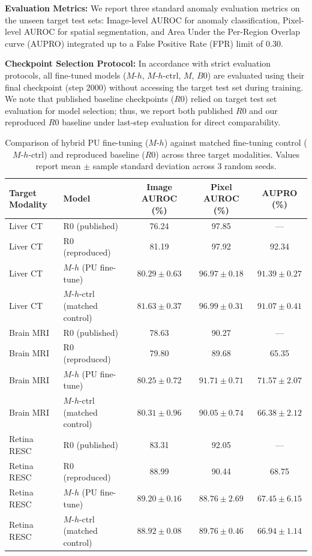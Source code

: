 \documentclass[10pt,twocolumn,letterpaper]{article}
\begin{document}
\noindent\textbf{Evaluation Metrics:} We report three standard anomaly evaluation metrics on the unseen target test sets: Image-level AUROC for anomaly classification, Pixel-level AUROC for spatial segmentation, and Area Under the Per-Region Overlap curve (AUPRO) integrated up to a False Positive Rate (FPR) limit of 0.30.

\noindent\textbf{Checkpoint Selection Protocol:} In accordance with strict evaluation protocols, all fine-tuned models ($M\text{-}h$, $M\text{-}h\text{-ctrl}$, $M$, $B0$) are evaluated using their final checkpoint (step 2000) without accessing the target test set during training. We note that published baseline checkpoints ($R0$) relied on target test set evaluation for model selection; thus, we report both published $R0$ and our reproduced $R0$ baseline under last-step evaluation for direct comparability.

\begin{table}[t]
\centering
\small
\begin{tabular}{@{}llccc@{}}
\toprule
\textbf{Target Modality} & \textbf{Model} & \textbf{Image AUROC (\%)} & \textbf{Pixel AUROC (\%)} & \textbf{AUPRO (\%)} \\
\midrule
Liver CT & R0 (published) & 76.24 & 97.85 & — \\
Liver CT & R0 (reproduced) & 81.19 & 97.92 & 92.34 \\
Liver CT & $M\text{-}h$ (PU fine-tune) & $80.29 \pm 0.63$ & $96.97 \pm 0.18$ & $91.39 \pm 0.27$ \\
Liver CT & $M\text{-}h\text{-ctrl}$ (matched control) & $81.63 \pm 0.37$ & $96.99 \pm 0.31$ & $91.07 \pm 0.41$ \\
\midrule
Brain MRI & R0 (published) & 78.63 & 90.27 & — \\
Brain MRI & R0 (reproduced) & 79.80 & 89.68 & 65.35 \\
Brain MRI & $M\text{-}h$ (PU fine-tune) & $80.25 \pm 0.72$ & $91.71 \pm 0.71$ & $71.57 \pm 2.07$ \\
Brain MRI & $M\text{-}h\text{-ctrl}$ (matched control) & $80.31 \pm 0.96$ & $90.05 \pm 0.74$ & $66.38 \pm 2.12$ \\
\midrule
Retina RESC & R0 (published) & 83.31 & 92.05 & — \\
Retina RESC & R0 (reproduced) & 88.99 & 90.44 & 68.75 \\
Retina RESC & $M\text{-}h$ (PU fine-tune) & $89.20 \pm 0.16$ & $88.76 \pm 2.69$ & $67.45 \pm 6.15$ \\
Retina RESC & $M\text{-}h\text{-ctrl}$ (matched control) & $88.92 \pm 0.08$ & $89.76 \pm 0.46$ & $66.94 \pm 1.14$ \\
\bottomrule
\end{tabular}
\caption{Comparison of hybrid PU fine-tuning ($M\text{-}h$) against matched fine-tuning control ($M\text{-}h\text{-ctrl}$) and reproduced baseline ($R0$) across three target modalities. Values report mean $\pm$ sample standard deviation across 3 random seeds.}
\label{tab:hybrid_results}
\end{table}
\end{document}
